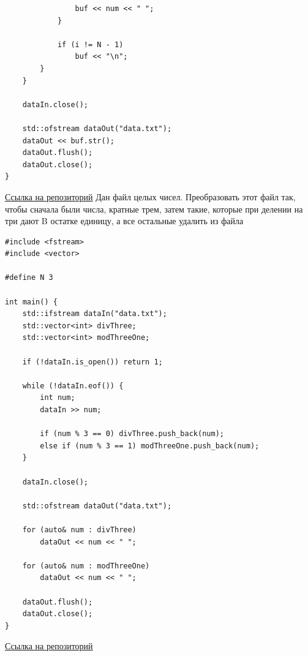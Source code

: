 \documentclass[a4paper,14pt]{extarticle}
\begin{document}
\begin{enumerate}[1.]
\begin{verbatim}
                buf << num << " ";
            }

            if (i != N - 1)
                buf << "\n";
        }
    }

    dataIn.close();

    std::ofstream dataOut("data.txt");
    dataOut << buf.str();
    dataOut.flush();
    dataOut.close();
}
    \end{verbatim}
    \href{https://github.com/IAmProgrammist/oop/tree/master/src/lab1/task1}{Ссылка на репозиторий}\bigbreak
    Дан файл целых чисел. Преобразовать этот файл так, чтобы сначала
были числа, кратные трем, затем такие, которые при делении на три
дают B остатке единицу, а все остальные удалить из файла\\
    \begin{verbatim}
#include <fstream>
#include <vector>

#define N 3

int main() {
    std::ifstream dataIn("data.txt");
    std::vector<int> divThree;
    std::vector<int> modThreeOne;

    if (!dataIn.is_open()) return 1;

    while (!dataIn.eof()) {
        int num;
        dataIn >> num;

        if (num % 3 == 0) divThree.push_back(num);
        else if (num % 3 == 1) modThreeOne.push_back(num);
    }

    dataIn.close();

    std::ofstream dataOut("data.txt");
    
    for (auto& num : divThree)
        dataOut << num << " ";

    for (auto& num : modThreeOne)
        dataOut << num << " ";

    dataOut.flush();
    dataOut.close();
}
    \end{verbatim}
    
    \href{https://github.com/IAmProgrammist/oop/tree/master/src/lab1/task2}{Ссылка на репозиторий}\\


\end{enumerate}
\end{document}
